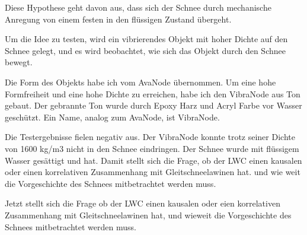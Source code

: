 
Diese Hypothese geht davon aus, dass sich der Schnee durch mechanische Anregung von einem festen in den flüssigen Zustand übergeht.

Um die Idee zu testen, wird ein vibrierendes Objekt mit hoher Dichte auf den Schnee gelegt, und es wird beobachtet, wie sich das Objekt durch den Schnee bewegt.

Die Form des Objekts habe ich vom AvaNode übernommen. Um eine hohe Formfreiheit und eine hohe Dichte zu erreichen, habe ich den VibraNode aus Ton gebaut. Der gebrannte Ton wurde durch Epoxy Harz und Acryl Farbe vor Wasser geschützt. Ein Name, analog zum AvaNode, ist VibraNode.

Die Testergebnisse fielen negativ aus. Der VibraNode konnte trotz seiner Dichte von 1600 kg/m3 nicht in den Schnee eindringen. Der Schnee wurde mit flüssigem Wasser gesättigt und hat.  Damit  stellt sich die Frage, ob der LWC einen kausalen oder einen korrelativen Zusammenhang mit Gleitschneelawinen hat. und wie weit die Vorgeschichte des Schnees mitbetrachtet werden muss.

Jetzt stellt sich die Frage ob der LWC einen kausalen oder eien korrelativen Zusammenhang mit Gleitschneelawinen hat, und wieweit die Vorgeschichte des Schnees mitbetrachtet werden muss.
